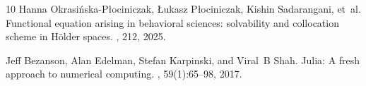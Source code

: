 \documentclass[12pt,a4paper]{article}
\begin{document}
\begin{thebibliography}{10}
	Hanna Okrasi{\'n}ska-P{\l}ociniczak, {\L}ukasz P{\l}ociniczak, Kishin
	Sadarangani, et~al.
	\newblock Functional equation arising in behavioral sciences: solvability and
	collocation scheme in {H}{\"o}lder spaces.
	, 212, 2025.
	
	Jeff Bezanson, Alan Edelman, Stefan Karpinski, and Viral~B Shah.
	\newblock Julia: A fresh approach to numerical computing.
	, 59(1):65--98, 2017.
	
\end{thebibliography}
\end{document}
